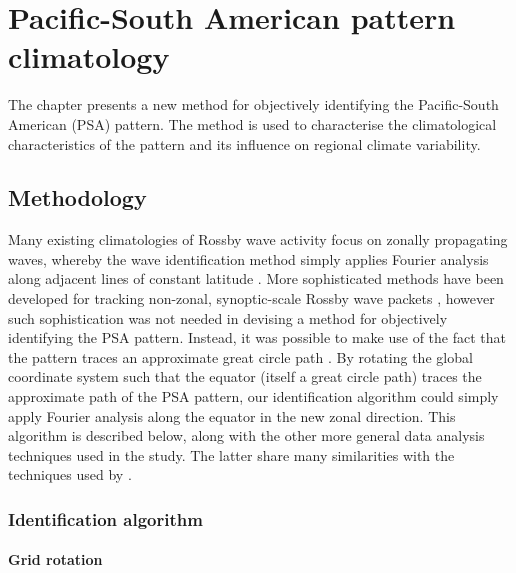 
\chapter{Pacific-South American pattern climatology}


\begin{synopsis}

The chapter presents a new method for objectively identifying the Pacific-South American (PSA) pattern. The method is used to characterise the climatological characteristics of the pattern and its influence on regional climate variability.

\end{synopsis}


\section{Methodology}

Many existing climatologies of Rossby wave activity focus on zonally propagating waves, whereby the wave identification method simply applies Fourier analysis along adjacent lines of constant latitude \citep[e.g.][]{Glatt2014,IrvingSimmonds2015}. More sophisticated methods have been developed for tracking non-zonal, synoptic-scale Rossby wave packets \citep[e.g.][]{Zimin2006,Souders2014}, however such sophistication was not needed in devising a method for objectively identifying the PSA pattern. Instead, it was possible to make use of the fact that the pattern traces an approximate great circle path \citep{Hoskins1981}. By rotating the global coordinate system such that the equator (itself a great circle path) traces the approximate path of the PSA pattern, our identification algorithm could simply apply Fourier analysis along the equator in the new zonal direction. This algorithm is described below, along with the other more general data analysis techniques used in the study. The latter share many similarities with the techniques used by \citet{IrvingSimmonds2015}.


\subsection{Identification algorithm}

\subsubsection{Grid rotation}

